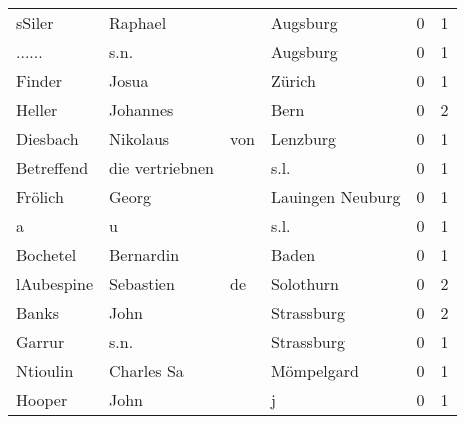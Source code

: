 \begin{center}
\begin{tiny}
\begin{longtabu}{llllrr}
                   sSiler &                            Raphael &             &                                    Augsburg &          0 &         1 \\
                   ...... &                               s.n. &             &                                    Augsburg &          0 &         1 \\
                   Finder &                              Josua &             &                                      Zürich &          0 &         1 \\
                   Heller &                           Johannes &             &                                        Bern &          0 &         2 \\
                 Diesbach &                           Nikolaus &         von &                                    Lenzburg &          0 &         1 \\
               Betreffend &                    die vertriebnen &             &                                        s.l. &          0 &         1 \\
                  Frölich &                              Georg &             &                            Lauingen Neuburg &          0 &         1 \\
                        a &                                  u &             &                                        s.l. &          0 &         1 \\
                 Bochetel &                          Bernardin &             &                                       Baden &          0 &         1 \\
               lAubespine &                          Sebastien &          de &                                   Solothurn &          0 &         2 \\
                    Banks &                               John &             &                                  Strassburg &          0 &         2 \\
                   Garrur &                               s.n. &             &                                  Strassburg &          0 &         1 \\
                 Ntioulin &                         Charles Sa &             &                                  Mömpelgard &          0 &         1 \\
                   Hooper &                               John &             &                                           j &          0 &         1 \\

\end{longtabu}
\end{tiny}
\end{center}

